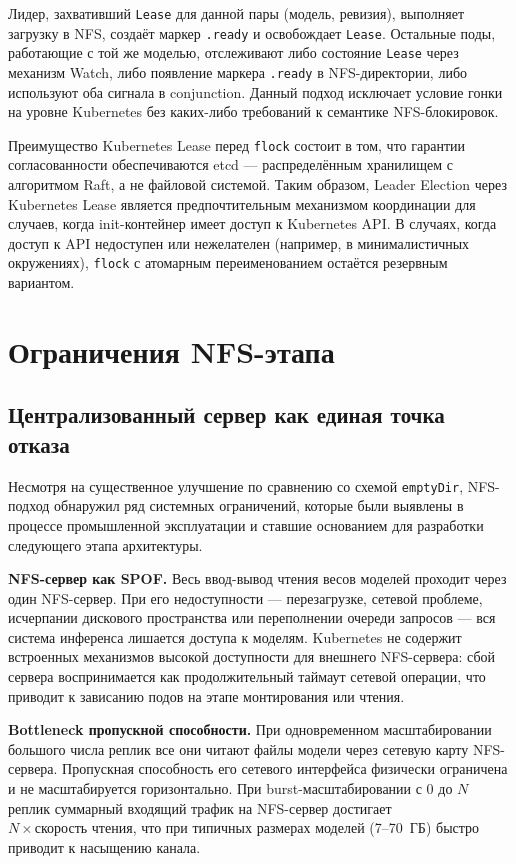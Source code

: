 Лидер, захвативший \texttt{Lease} для данной пары (модель, ревизия), выполняет загрузку в NFS, создаёт маркер \texttt{.ready} и освобождает \texttt{Lease}. Остальные поды, работающие с той же моделью, отслеживают либо состояние \texttt{Lease} через механизм Watch, либо появление маркера \texttt{.ready} в NFS-директории, либо используют оба сигнала в conjunction. Данный подход исключает условие гонки на уровне Kubernetes без каких-либо требований к семантике NFS-блокировок.

Преимущество Kubernetes Lease перед \texttt{flock} состоит в том, что гарантии согласованности обеспечиваются etcd --- распределённым хранилищем с алгоритмом Raft, а не файловой системой. Таким образом, Leader Election через Kubernetes Lease является предпочтительным механизмом координации для случаев, когда init-контейнер имеет доступ к Kubernetes API. В случаях, когда доступ к API недоступен или нежелателен (например, в минималистичных окружениях), \texttt{flock} с атомарным переименованием остаётся резервным вариантом.

\section{Ограничения NFS-этапа}

\subsection*{Централизованный сервер как единая точка отказа}

Несмотря на существенное улучшение по сравнению со схемой \texttt{emptyDir}, NFS-подход обнаружил ряд системных ограничений, которые были выявлены в процессе промышленной эксплуатации и ставшие основанием для разработки следующего этапа архитектуры.

\textbf{NFS-сервер как SPOF.} Весь ввод-вывод чтения весов моделей проходит через один NFS-сервер. При его недоступности --- перезагрузке, сетевой проблеме, исчерпании дискового пространства или переполнении очереди запросов --- вся система инференса лишается доступа к моделям. Kubernetes не содержит встроенных механизмов высокой доступности для внешнего NFS-сервера: сбой сервера воспринимается как продолжительный таймаут сетевой операции, что приводит к зависанию подов на этапе монтирования или чтения.

\textbf{Bottleneck пропускной способности.} При одновременном масштабировании большого числа реплик все они читают файлы модели через сетевую карту NFS-сервера. Пропускная способность его сетевого интерфейса физически ограничена и не масштабируется горизонтально. При burst-масштабировании с 0 до $N$ реплик суммарный входящий трафик на NFS-сервер достигает $N \times \text{скорость чтения}$, что при типичных размерах моделей (7--70~ГБ) быстро приводит к насыщению канала.

